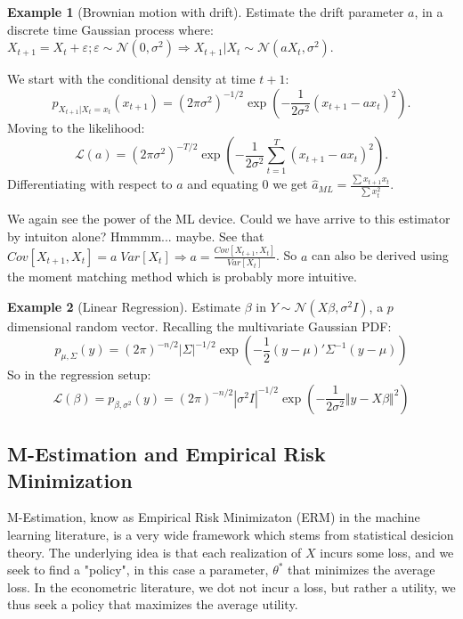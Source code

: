 \documentclass[12pt,a4paper]{article}
\theoremstyle{plain}
\theoremstyle{definition}
\newtheorem{example}{Example}
\newcommand{\gauss}[1]{\mathcal{N}(#1)}
\newcommand{\norm}[1]{\Vert #1 \Vert}
\newcommand{\lik}{\mathcal{L}}
\begin{document}
\begin{example}[Brownian motion with drift]
Estimate the drift parameter $a$,  in a discrete time Gaussian process where:
$X_{t+1}=X_t+\varepsilon; \varepsilon \sim \gauss{0,\sigma^2} \Rightarrow X_{t+1}|X_t \sim \gauss{a X_t,\sigma^2}$.

We start with the conditional density at time $t+1$:
$$
  p_{X_{t+1}|X_t=x_t}(x_{t+1}) = 
  (2 \pi \sigma^2)^{-1/2} \exp \left( 
    -\frac{1}{2 \sigma^2}(x_{t+1}-a x_t)^2 
  \right).
$$
Moving to the likelihood:
$$
  \lik(a) = 
  (2 \pi \sigma^2)^{-T/2} \exp \left(
    -\frac{1}{2 \sigma^2}\sum_{t=1}^T (x_{t+1}-a x_t)^2 
  \right).
$$
Differentiating with respect to $a$ and equating $0$ we get $\hat{a}_{ML}=\frac{\sum x_{t+1}x_{t}}{\sum x_t^2}$.

We again see the power of the ML device.
Could we have arrive to this estimator by intuiton alone? Hmmmm... maybe. 
See that $Cov[X_{t+1},X_t] = a \; Var[X_t] \Rightarrow a=\frac{Cov[X_{t+1},X_t]}{Var[X_t]}$.
So $a$ can also be derived using the moment matching method which is probably more intuitive.

\end{example}

\begin{example}[Linear Regression]

Estimate $\beta$ in $Y \sim \gauss{X\beta,\sigma^2 I}$, a $p$ dimensional random vector.
Recalling the multivariate Gaussian PDF:
$$
  p_{\mu,\Sigma}(y) = 
  (2 \pi)^{-n/2} |\Sigma|^{-1/2} \exp\left(
    -\frac{1}{2} (y-\mu)' \Sigma^{-1} (y-\mu)
  \right)
$$
So in the regression setup:
$$
  \lik(\beta)= 
  p_{\beta,\sigma^2}(y) = 
  (2 \pi)^{-n/2} |\sigma^2 I|^{-1/2} \exp\left(
    -\frac{1}{2 \sigma^2} \norm{y-X\beta}^2
  \right)
$$

\end{example}


\subsection{M-Estimation and Empirical Risk Minimization}
\label{sec:m_estimation}

M-Estimation, know as Empirical Risk Minimizaton (ERM) in the machine learning literature, is a very wide framework which stems from statistical desicion theory.
The underlying idea is that each realization of $X$ incurs some loss, and we seek to find a "policy", in this case a parameter, $\theta^*$ that minimizes the average loss.
In the econometric literature, we dot not incur a loss, but rather a utility, we thus seek a policy that maximizes the average utility.
\end{document}

